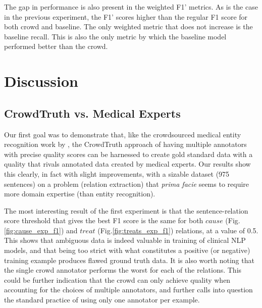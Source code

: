The gap in performance is also present in the weighted F1' metrics. As is the case in the previous experiment, the F1' scores higher than the regular F1 score for both crowd and baseline. The only weighted metric that does not increase is the baseline recall. This is also the only metric by which the baseline model performed better than the crowd.


\section{Discussion}

\subsection{CrowdTruth vs. Medical Experts}

Our first goal was to demonstrate that, like the crowdsourced medical entity recognition work by \cite{zhai2013web}, the CrowdTruth approach of having multiple annotators with precise quality scores can be harnessed to create gold standard data with a quality that rivals annotated data created by medical experts.  Our results show this clearly, in fact with slight improvements, with a sizable dataset (975 sentences) on a problem (relation extraction) that {\em prima facie} seems to require more domain expertise (than entity recognition).

The most interesting result of the first experiment is that the sentence-relation score threshold that gives the best F1 score is the same for both $cause$ (Fig.\ref{fig:cause_exp_f1}) and $treat$ (Fig.\ref{fig:treats_exp_f1}) relations, at a value of 0.5. This shows that ambiguous data is indeed valuable in training of clinical NLP models, and that being too strict with what constitutes a positive (or negative) training example produces flawed ground truth data. It is also worth noting that the single crowd annotator performs the worst for each of the relations. This could be further indication that the crowd can only achieve quality when accounting for the choices of multiple annotators, and further calls into question the standard practice of using only one annotator per example.

